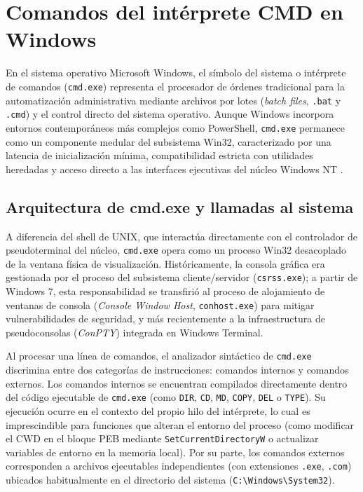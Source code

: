\documentclass[12pt]{article}
\begin{document}
\section{Comandos del intérprete CMD en Windows}
\label{sec:comandosCmdWindows}

En el sistema operativo Microsoft Windows, el símbolo del sistema o intérprete de comandos (\texttt{cmd.exe}) representa el procesador de órdenes tradicional para la automatización administrativa mediante archivos por lotes (\textit{batch files}, \texttt{.bat} y \texttt{.cmd}) y el control directo del sistema operativo. Aunque Windows incorpora entornos contemporáneos más complejos como PowerShell, \texttt{cmd.exe} permanece como un componente medular del subsistema Win32, caracterizado por una latencia de inicialización mínima, compatibilidad estricta con utilidades heredadas y acceso directo a las interfaces ejecutivas del núcleo Windows NT \parencite[\S 21.4, p.\ 1045]{deitel2004operating}.

\subsection{Arquitectura de cmd.exe y llamadas al sistema}
\label{subsec:arquitecturaCmdEjecucion}

A diferencia del shell de UNIX, que interactúa directamente con el controlador de pseudoterminal del núcleo, \texttt{cmd.exe} opera como un proceso Win32 desacoplado de la ventana física de visualización. Históricamente, la consola gráfica era gestionada por el proceso del subsistema cliente/servidor (\texttt{csrss.exe}); a partir de Windows 7, esta responsabilidad se transfirió al proceso de alojamiento de ventanas de consola (\textit{Console Window Host}, \texttt{conhost.exe}) para mitigar vulnerabilidades de seguridad, y más recientemente a la infraestructura de pseudoconsolas (\textit{ConPTY}) integrada en Windows Terminal.

Al procesar una línea de comandos, el analizador sintáctico de \texttt{cmd.exe} discrimina entre dos categorías de instrucciones: comandos internos y comandos externos. Los comandos internos se encuentran compilados directamente dentro del código ejecutable de \texttt{cmd.exe} (como \texttt{DIR}, \texttt{CD}, \texttt{MD}, \texttt{COPY}, \texttt{DEL} o \texttt{TYPE}). Su ejecución ocurre en el contexto del propio hilo del intérprete, lo cual es imprescindible para funciones que alteran el entorno del proceso (como modificar el CWD en el bloque PEB mediante \texttt{SetCurrentDirectoryW} o actualizar variables de entorno en la memoria local). Por su parte, los comandos externos corresponden a archivos ejecutables independientes (con extensiones \texttt{.exe}, \texttt{.com}) ubicados habitualmente en el directorio del sistema (\texttt{C:\textbackslash Windows\textbackslash System32}).
\end{document}
